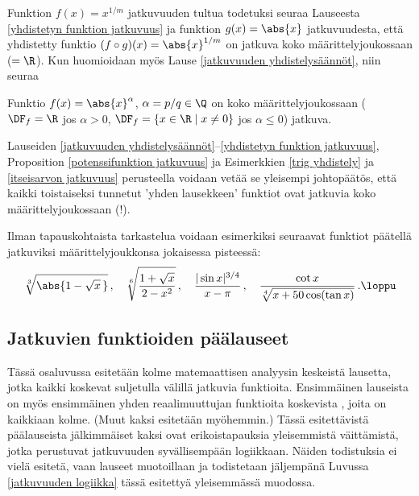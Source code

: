 Funktion $f(x)=x^{1/m}$ jatkuvuuden tultua todetuksi seuraa Lauseesta 
\ref{yhdistetyn funktion jatkuvuus} ja funktion $g(x)=\abs{x}$ jatkuvuudesta, että yhdistetty 
funktio $(f\circ g)(x) = \abs{x}^{1/m}$ on jatkuva koko määrittelyjoukossaan ($= \R$). Kun
huomioidaan myös Lause \ref{jatkuvuuden yhdistelysäännöt}, niin seuraa
\begin{Prop} \label{potenssifunktion jatkuvuus}
Funktio $f(x)=\abs{x}^\alpha$, $\alpha=p/q\in\Q$ on koko määrittelyjoukossaan ($\DF_f=\R$ jos
$\alpha>0$, $\DF_f=\{x\in\R \mid x \neq 0\}$ jos $\alpha \leq 0$) jatkuva.
\end{Prop}
Lauseiden \ref{jatkuvuuden yhdistelysäännöt}--\ref{yhdistetyn funktion jatkuvuus}, Proposition
\ref{potenssifunktion jatkuvuus} ja Esimerkkien \ref{trig yhdistely} ja
\ref{itseisarvon jatkuvuus} perusteella voidaan vetää se yleisempi johtopäätös, että kaikki
toistaiseksi tunnetut 'yhden lausekkeen' funktiot ovat jatkuvia koko määrittelyjoukossaan (!).
\begin{Exa} Ilman tapauskohtaista tarkastelua voidaan esimerkiksi seuraavat funktiot
päätellä jatkuviksi määrittelyjoukkonsa jokaisessa pisteessä:
\[
\sqrt[3]{\abs{1-\sqrt{x}\,}}\,, \quad 
\sqrt[6]{\frac{1+\sqrt{x}}{2-x^2}}\,, \quad
\frac{|\sin x|^{3/4}}{x-\pi}\,, \quad 
\frac{\cot x}{\sqrt[4]{x+50\cos(\tan x)}}\,. \loppu
\]
\end{Exa}

\subsection*{Jatkuvien funktioiden päälauseet}

Tässä osaluvussa esitetään kolme matemaattisen analyysin keskeistä lausetta, jotka kaikki
koskevat suljetulla välillä jatkuvia funktioita. Ensimmäinen lauseista on myös ensimmäinen
yhden reaalimuuttujan funktioita koskevista , joita on kaikkiaan kolme.
(Muut kaksi esitetään myöhemmin.) Tässä esitettävistä päälauseista jälkimmäiset kaksi ovat
erikoistapauksia yleisemmistä väittämistä, jotka perustuvat jatkuvuuden syvällisempään
logiikkaan. Näiden todistuksia ei vielä esitetä, vaan lauseet muotoillaan ja todistetaan
jäljempänä Luvussa \ref{jatkuvuuden logiikka} tässä esitettyä yleisemmässä muodossa. 
 
